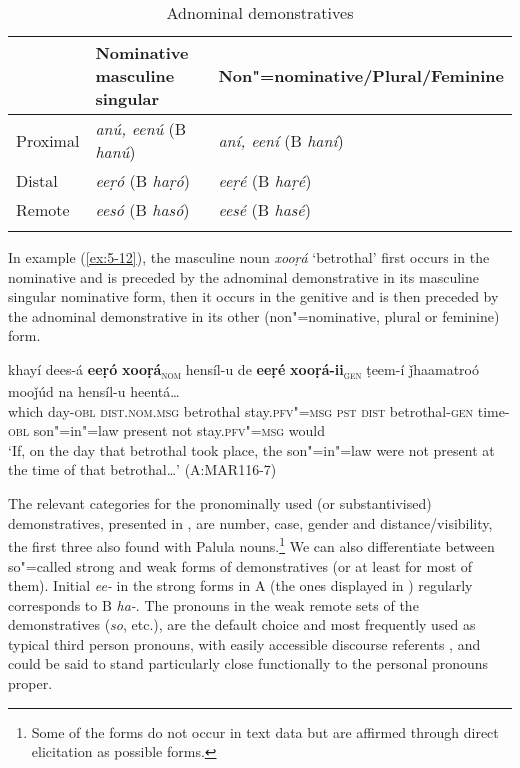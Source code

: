 \begin{table}[ht]
\caption{Adnominal demonstratives}
\begin{tabularx}{\textwidth}{ l@{\hspace{30pt}} Q Q }
\lsptoprule
&
Nominative masculine singular &
Non"=nominative/{\allowbreak}Plural/{\allowbreak}Feminine\\\midrule
Proximal &
\textit{anú, eenú} (B \textit{hanú}) &
\textit{aní, eení} (B \textit{haní})\\
Distal &
\textit{eeṛó} (B \textit{haṛó}) &
\textit{eeṛé} (B \textit{haṛé})\\
Remote &
\textit{eesó} (B \textit{hasó}) &
\textit{eesé} (B \textit{hasé})\\\lspbottomrule
\end{tabularx}
\label{tab:5-3}
\end{table}



In example (\ref{ex:5-12}), the masculine noun \textit{xooṛá} `betrothal' first occurs in the nominative and is preceded by the adnominal demonstrative in its masculine singular nominative form, then it occurs in the genitive and is then preceded by the adnominal demonstrative in its other (non"=nominative, plural or feminine) form.

\ea
\label{ex:5-12}
\gll khayí dees-á {\ob}\textbf{eeṛó} \textbf{xooṛá}{\cb}\textsc{\textsubscript{\upshape nom}}  hensíl-u de {\ob}\textbf{eeṛé} \textbf{xooṛá-ii}{\cb}\textsc{\textsubscript{\upshape gen}} ṭeem-í ǰhaamatroó mooǰúd na hensíl-u
heentá{\dots} \\
which day-\textsc{obl} \textsc{dist.nom.msg} betrothal stay.\textsc{pfv"=msg} \textsc{pst}
\textsc{dist} betrothal-\textsc{gen} time-\textsc{obl} son"=in"=law present not stay.\textsc{pfv"=msg} would\\
\glt `If, on the day that betrothal took place, the son"=in"=law were not present at the time of that betrothal{\ldots}' (A:MAR116-7)
\z

The relevant categories for the pronominally used (or substantivised) demonstratives, presented in
, are number, case, gender and distance/visibility, the first three also found with Palula nouns.\footnote{Some of the forms do not occur in text data but are affirmed through direct elicitation as possible forms.} We can also differentiate between so"=called strong and weak forms of demonstratives (or at least for most of them). Initial \textit{ee-} in the strong forms in A (the ones displayed in ) regularly corresponds to B \textit{ha-}. The pronouns in the weak remote sets of the demonstratives (\textit{so}, etc.), are the default choice and most frequently used as typical third person pronouns, with easily accessible discourse referents \citep[432--433]{diessel2006}, and could be said to stand particularly close functionally to the personal pronouns proper. 


